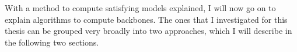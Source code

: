 With a method to compute satisfying models explained, I will now go on to explain algorithms to compute backbones. The ones that I investigated for this thesis can be grouped very broadly into two approaches, which I will describe in the following two sections.
